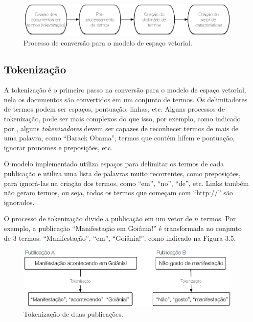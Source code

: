 \begin{figure}[htpb]
	\begin{center}
		\includegraphics[width=1.0\textwidth]{figuras/processo-modelo-espaco-vetorial.eps}
		\caption{Processo de conversão para o modelo de espaço vetorial.}
	\end{center}
\end{figure}

\subsection{Tokenização}

A tokenização é o primeiro passo na conversão para o modelo de espaço vetorial, nela os documentos são convertidos em um conjunto de termos. Os delimitadores de termos podem ser espaços, pontuação, linhas, etc. Alguns processos de tokenização, pode ser mais complexos do que isso, por exemplo, como indicado por , alguns \textit{tokenizadores} devem ser capazes de reconhecer termos de mais de uma palavra, como ``Barack Obama'', termos que contém hífem e pontuação, ignorar pronomes e preposições, etc.

O modelo implementado utiliza espaços para delimitar os termos de cada publicação e utiliza uma lista de palavras muito recorrentes, como preposições, para ignorá-las na criação dos termos, como ``em'', ``no'', ``de'', etc. Links também não geram termos, ou seja, todos os termos que começam com ``http://'' são ignorados.

O processo de tokenização divide a publicação em um vetor de $n$ termos. Por exemplo, a publicação ``Manifestação em Goiânia!'' é transformada no conjunto de 3 termos: ``Manifestação'', ``em'', ``Goiânia!'', como indicado na Figura 3.5.

\begin{figure}[htpb]
	\begin{center}
		\includegraphics[width=1.0\textwidth]{figuras/tokenizacao.eps}
		\caption{Tokenização de duas publicações.}
	\end{center}
\end{figure}

